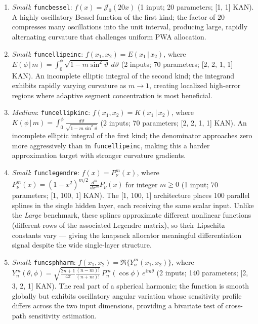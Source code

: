 \begin{enumerate}
    \item \emph{Small}: \texttt{funcbessel}: $f(x) = \mathcal{J}_0(20 x)$ (1 input; 20 parameters; [1, 1] KAN). A highly oscillatory Bessel function of the first kind; the factor of $20$ compresses many oscillations into the unit interval, producing large, rapidly alternating curvature that challenges uniform PWA allocation.
    \item \emph{Small}: \texttt{funcellipeinc}: $f(x_1, x_2) = E(x_1\,|\,x_2)$, where $E(\phi\,|\,m)=\int_{0}^{\phi}\sqrt{1-m\sin^2\vartheta}\,d\vartheta$ (2 inputs; 70 parameters; [2, 2, 1, 1] KAN). An incomplete elliptic integral of the second kind; the integrand exhibits rapidly varying curvature as $m \to 1$, creating localized high-error regions where adaptive segment concentration is most beneficial.
    \item \emph{Medium}: \texttt{funcellipkinc}: $f(x_1, x_2) = K(x_1\,|\,x_2)$, where $K(\phi\,|\,m)=\int_{0}^{\phi}\frac{d\vartheta}{\sqrt{1-m\sin^2\vartheta}}$ (2 inputs; 70 parameters; [2, 2, 1, 1] KAN). An incomplete elliptic integral of the first kind; the denominator approaches zero more aggressively than in \texttt{funcellipeinc}, making this a harder approximation target with stronger curvature gradients.
    \item \emph{Small}: \texttt{funclegendre}: $f(x) = P_{\nu}^{m}(x)$, where $P_{\nu}^{m}(x) = (1-x^2)^{m/2}\,\frac{d^m}{dx^m}P_{\nu}(x)$ for integer $m\ge 0$ (1 input; 70 parameters; [1, 100, 1] KAN). The [1, 100, 1] architecture places 100 parallel splines in the single hidden layer, each receiving the same scalar input. Unlike the \emph{Large} benchmark, these splines approximate different nonlinear functions (different rows of the associated Legendre matrix), so their Lipschitz constants vary --- giving the knapsack allocator meaningful differentiation signal despite the wide single-layer structure.
    \item \emph{Small}: \texttt{funcsphharm}: $f(x_1, x_2) = \Re\{Y_{n}^{m}(x_1,x_2)\}$, where $Y_{n}^{m}(\theta,\phi)=\sqrt{\frac{2n+1}{4\pi}\frac{(n-m)!}{(n+m)!}}\,P_{n}^{m}(\cos\phi)\,e^{im\theta}$ (2 inputs; 140 parameters; [2, 3, 2, 1] KAN). The real part of a spherical harmonic; the function is smooth globally but exhibits oscillatory angular variation whose sensitivity profile differs across the two input dimensions, providing a bivariate test of cross-path sensitivity estimation.
\end{enumerate}

